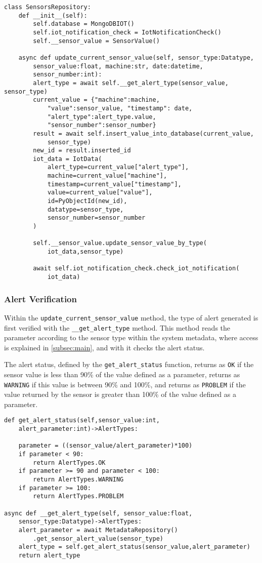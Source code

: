 \begin{verbatim}
class SensorsRepository:
    def __init__(self):
        self.database = MongoDBIOT()
        self.iot_notification_check = IotNotificationCheck()
        self.__sensor_value = SensorValue()

    async def update_current_sensor_value(self, sensor_type:Datatype,
        sensor_value:float, machine:str, date:datetime, 
        sensor_number:int):
        alert_type = await self.__get_alert_type(sensor_value, sensor_type)
        current_value = {"machine":machine,
            "value":sensor_value, "timestamp": date,
            "alert_type":alert_type.value,
            "sensor_number":sensor_number}
        result = await self.insert_value_into_database(current_value, 
            sensor_type)
        new_id = result.inserted_id
        iot_data = IotData(
            alert_type=current_value["alert_type"],
            machine=current_value["machine"],
            timestamp=current_value["timestamp"],
            value=current_value["value"],
            id=PyObjectId(new_id),
            datatype=sensor_type,
            sensor_number=sensor_number
        )
        
        self.__sensor_value.update_sensor_value_by_type(
            iot_data,sensor_type)
        
        await self.iot_notification_check.check_iot_notification(
            iot_data)
\end{verbatim}

\subsubsection{Alert Verification}

Within the \texttt{update\_current\_sensor\_value} method, the type of alert generated is first verified with the \texttt{\_\_get\_alert\_type} method. This method reads the parameter according to the sensor type within the system metadata, where access is explained in \ref{subsec:main}, and with it checks the alert status.

The alert status, defined by the \texttt{get\_alert\_status} function, returns as \texttt{OK} if the sensor value is less than 90\% of the value defined as a parameter, returns as \texttt{WARNING} if this value is between 90\% and 100\%, and returns as \texttt{PROBLEM} if the value returned by the sensor is greater than 100\% of the value defined as a parameter.

\begin{verbatim}
def get_alert_status(self,sensor_value:int,
    alert_parameter:int)->AlertTypes:

    parameter = ((sensor_value/alert_parameter)*100)
    if parameter < 90:
        return AlertTypes.OK
    if parameter >= 90 and parameter < 100:
        return AlertTypes.WARNING
    if parameter >= 100:
        return AlertTypes.PROBLEM

async def __get_alert_type(self, sensor_value:float,
    sensor_type:Datatype)->AlertTypes:
    alert_parameter = await MetadataRepository()
        .get_sensor_alert_value(sensor_type)
    alert_type = self.get_alert_status(sensor_value,alert_parameter)
    return alert_type
\end{verbatim}

